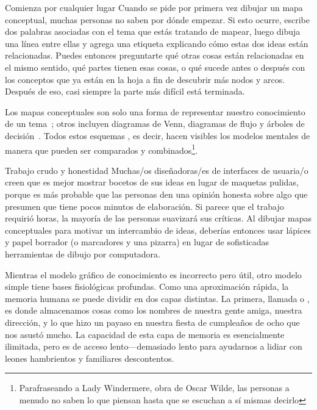 \begin{aside}{Comienza por cualquier lugar}
  Cuando se pide por primera vez dibujar un mapa conceptual, muchas personas no saben por dónde empezar.
  Si esto ocurre,
  escribe dos palabras asociadas con el tema que estás tratando de mapear,
 luego dibuja una línea entre ellas y agrega una etiqueta explicando cómo estas dos ideas están relacionadas.
  Puedes entonces preguntarte qué otras cosas están relacionadas en el mismo sentido,
  qué partes tienen esas cosas,
  o qué sucede antes o después con los conceptos que ya están en la hoja
  a fin de descubrir más nodos y arcos.
  Después de eso, casi siempre la parte más difícil está terminada.
\end{aside}

Los mapas conceptuales son solo una forma de representar nuestro conocimiento de un tema~\cite{Eppl2006};
otros incluyen diagramas de Venn, diagramas de flujo y árboles de decisión~\cite{Abel2009}.
Todos estos esquemas ,
es decir, hacen visibles los modelos mentales de manera que pueden ser comparados y combinados\footnote{Parafraseando a
 Lady Windermere, obra de Oscar Wilde,
las personas a menudo no saben lo que piensan hasta que se escuchan a sí mismas decirlo}.

\begin{aside}{Trabajo crudo y honestidad}
  Muchas/os diseñadoras/es de interfaces de usuaria/o creen que es mejor mostrar bocetos de sus ideas en lugar de maquetas pulidas,
  porque es más probable que las personas den una opinión honesta sobre algo que 
  presumen que tiene pocos minutos de elaboración.
  Si parece que el trabajo requirió horas, 
  la mayoría de las personas suavizará sus críticas.
  Al dibujar mapas conceptuales para motivar un intercambio de ideas,
  deberías entonces usar lápices y papel borrador (o marcadores y una pizarra)
  en lugar de sofisticadas herramientas de dibujo por computadora.
\end{aside}


Mientras el modelo gráfico de conocimiento es incorrecto pero útil,
otro modelo simple tiene bases fisiológicas profundas.
Como una aproximación rápida,
la memoria humana se puede dividir en dos capas distintas.
La primera,
llamada 
o ,
es donde almacenamos cosas como los nombres de nuestra gente amiga,
nuestra dirección,
y lo que hizo un payaso en nuestra fiesta de cumpleaños de ocho que nos asustó mucho.
La capacidad de esta capa de memoria es esencialmente ilimitada,
pero es de acceso lento---demasiado lento para ayudarnos a lidiar con leones hambrientos y familiares descontentos.

